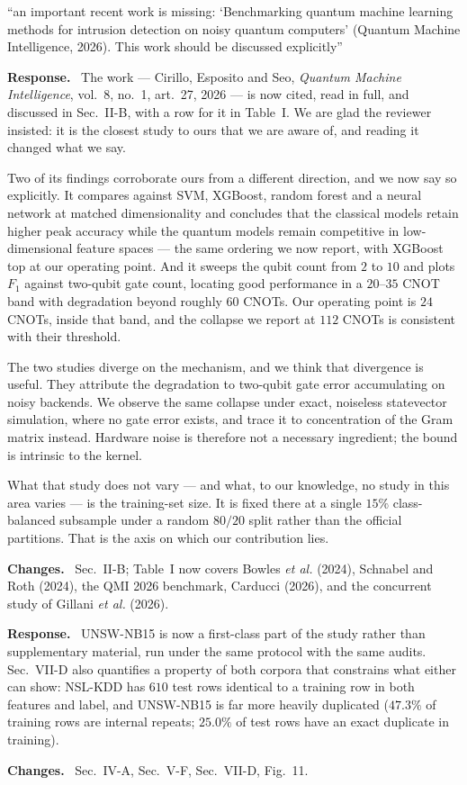 \documentclass[11pt,a4paper]{article}
\newenvironment{revcomment}
  {\par\addvspace{6pt}\begingroup
   \color{quotegray}\itshape\small
   \begin{list}{}{%
     \setlength{\leftmargin}{1.8em}\setlength{\rightmargin}{1.0em}%
     \setlength{\topsep}{0pt}\setlength{\partopsep}{0pt}%
     \setlength{\parsep}{3pt}\setlength{\itemsep}{0pt}}%
   \item[]}
  {\end{list}\endgroup\normalcolor\addvspace{6pt}}
\newcommand{\itemhead}[2]{%
  \par\addvspace{15pt}%
  \noindent{\bfseries\color{tagink}#1}\hspace{0.7em}{\bfseries #2}%
  \par\addvspace{3.5pt}%
  \noindent{\color{rulegray}\rule{\linewidth}{0.5pt}}%
  \par\addvspace{5pt}%
  \nobreak}
\newcommand{\resp}{\par\addvspace{2pt}\noindent\textbf{Response.}\ }
\newcommand{\changed}{\par\addvspace{5pt}\noindent
  {\bfseries\color{tagink}Changes.}\ }
\begin{document}
\itemhead{R1-1}{Missing QMI 2026 benchmark; Table~I needs 2025--2026 literature}
\begin{revcomment}
``an important recent work is missing: `Benchmarking quantum machine learning
methods for intrusion detection on noisy quantum computers' (Quantum Machine
Intelligence, 2026). This work should be discussed explicitly''
\end{revcomment}
\resp
The work --- Cirillo, Esposito and Seo, \emph{Quantum Machine Intelligence},
vol.~8, no.~1, art.~27, 2026 --- is now cited, read in full, and discussed in
Sec.~II-B, with a row for it in Table~I. We are glad the reviewer insisted: it
is the closest study to ours that we are aware of, and reading it changed what
we say.

Two of its findings corroborate ours from a different direction, and we now say
so explicitly. It compares against SVM, XGBoost, random forest and a neural
network at matched dimensionality and concludes that the classical models retain
higher peak accuracy while the quantum models remain competitive in
low-dimensional feature spaces --- the same ordering we now report, with XGBoost
top at our operating point. And it sweeps the qubit count from $2$ to $10$ and
plots $F_1$ against two-qubit gate count, locating good performance in a
$20$--$35$ CNOT band with degradation beyond roughly $60$ CNOTs. Our operating
point is $24$ CNOTs, inside that band, and the collapse we report at $112$ CNOTs
is consistent with their threshold.

The two studies diverge on the mechanism, and we think that divergence is
useful. They attribute the degradation to two-qubit gate error accumulating on
noisy backends. We observe the same collapse under exact, noiseless statevector
simulation, where no gate error exists, and trace it to concentration of the
Gram matrix instead. Hardware noise is therefore not a necessary ingredient; the
bound is intrinsic to the kernel.

What that study does not vary --- and what, to our knowledge, no study in this
area varies --- is the training-set size. It is fixed there at a single $15\%$
class-balanced subsample under a random $80/20$ split rather than the official
partitions. That is the axis on which our contribution lies.
\changed
Sec.~II-B; Table~I now covers Bowles \emph{et al.} (2024), Schnabel and Roth
(2024), the QMI 2026 benchmark, Carducci (2026), and the concurrent study of
Gillani \emph{et al.} (2026).

\itemhead{R1-2}{Reliance on NSL-KDD; UNSW supplementary was not available}
\resp
UNSW-NB15 is now a first-class part of the study rather than supplementary
material, run under the same protocol with the same audits. Sec.~VII-D also
quantifies a property of both corpora that constrains what either can show:
NSL-KDD has $610$ test rows identical to a training row in both features and
label, and UNSW-NB15 is far more heavily duplicated ($47.3\%$ of training rows
are internal repeats; $25.0\%$ of test rows have an exact duplicate in
training).
\changed
Sec.~IV-A, Sec.~V-F, Sec.~VII-D, Fig.~11.
\end{document}

